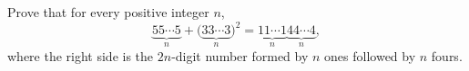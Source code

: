 Prove that for every positive integer $n$,
\[
\underbrace{55\cdots5}_{n}+\bigl(\underbrace{33\cdots3}_{n}\bigr)^2=\underbrace{11\cdots1}_{n}\underbrace{44\cdots4}_{n},
\]
where the right side is the $2n$-digit number formed by $n$ ones followed by $n$ fours.
